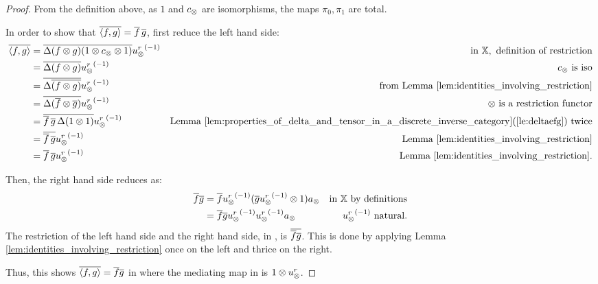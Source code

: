 \begin{proof}
  From the definition above, as $1$ and $c_{\otimes}$ are isomorphisms, the maps $\pi_0, \pi_1$ are
  total.

  In order to show that $\overline{\langle f,g\rangle} = \overline{f}\,\overline{g}$, first reduce the left hand side:
  \begin{align*}
    \overline{\langle f,g\rangle}
      &=\overline{\Delta(f\otimes g)(1\otimes c_{\otimes}\otimes1)}{u_{\otimes}^r}^{(-1)}&\text{in }\mathbb{X}, \text{ definition of restriction}\\
    &=\overline{\Delta(f\otimes g)}{u_{\otimes}^r}^{(-1)} &c_{\otimes}\text{ is iso}\\
    &=\overline{\Delta\overline{(f\otimes g)}}{u_{\otimes}^r}^{(-1)} &\text{from Lemma \ref{lem:identities_involving_restriction}}\\
    &=\overline{\Delta(\overline{f}\otimes\overline{g})}{u_{\otimes}^r}^{(-1)} &\otimes\text{ is a restriction functor}\\
    &=\overline{\overline{f}\,\overline{g}\,\Delta(1\otimes1)}{u_{\otimes}^r}^{(-1)} &\text{Lemma  \ref{lem:properties_of_delta_and_tensor_in_a_discrete_inverse_category}(\ref{le:deltaefg}) twice}\\
    &=\overline{\overline{f}\,\overline{g}}{u_{\otimes}^r}^{(-1)} &\text{Lemma  \ref{lem:identities_involving_restriction}}\\
    &=\overline{f}\,\overline{g}{u_{\otimes}^r}^{(-1)}  &\text{Lemma  \ref{lem:identities_involving_restriction}.}\\
  \end{align*}

  Then, the right hand side reduces as:
  \begin{align*}
    \rst{f} \rst{g}
    &= \rst{f}\inv{\usr}(\rst{g}\inv{\usr} \* 1) a_{\*} & \text{in \X by definitions}\\
    &= \rst{f} \rst{g}\inv{\usr}\inv{\usr} a_{\*} &  \inv{\usr}\text{ natural.}
  \end{align*}
  The restriction of the left hand side and the right hand side, in \X, is $\overline{\overline{f} \overline{g}}$.
  This is done by applying Lemma \vref{lem:identities_involving_restriction} once on the left and
  thrice on the right.

  Thus, this shows $\overline{\langle f,g\rangle}=\overline{f} \overline{g}$ in \Xt where the mediating map in \X is
  $1\otimes u_{\otimes}^r$.


\end{proof}
